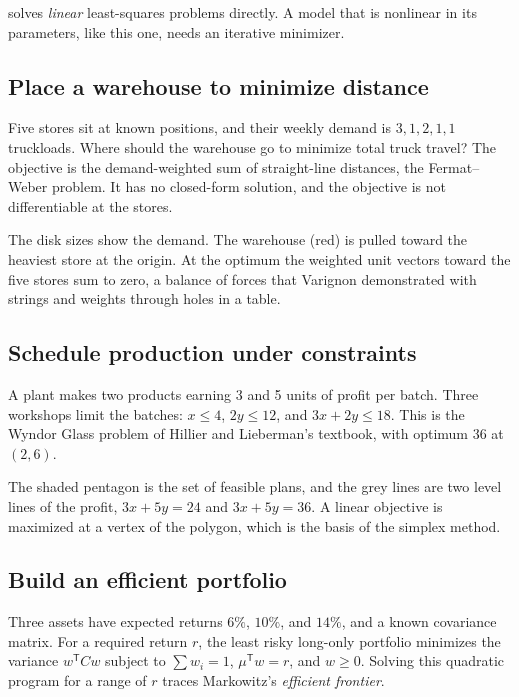 
 solves \emph{linear} least-squares problems directly. A model that is
nonlinear in its parameters, like this one, needs an iterative minimizer.

\subsection*{Place a warehouse to minimize distance}

Five stores sit at known positions, and their weekly demand is \(3, 1, 2, 1,
1\) truckloads. Where should the warehouse go to minimize total truck travel?
The objective is the demand-weighted sum of straight-line distances, the
Fermat--Weber problem. It has no closed-form solution, and the objective is not
differentiable at the stores.


The disk sizes show the demand. The warehouse (red) is pulled toward the
heaviest store at the origin. At the optimum the weighted unit vectors toward
the five stores sum to zero, a balance of forces that Varignon demonstrated
with strings and weights through holes in a table.

\subsection*{Schedule production under constraints}

A plant makes two products earning 3 and 5 units of profit per batch. Three
workshops limit the batches: \(x \le 4\), \(2y \le 12\), and \(3x + 2y \le
18\). This is the Wyndor Glass problem of Hillier and Lieberman's textbook,
with optimum \(36\) at \((2, 6)\).


The shaded pentagon is the set of feasible plans, and the grey lines are two
level lines of the profit, \(3x + 5y = 24\) and \(3x + 5y = 36\). A linear
objective is maximized at a vertex of the polygon, which is the basis of the
simplex method.

\subsection*{Build an efficient portfolio}

Three assets have expected returns \(6\%\), \(10\%\), and \(14\%\), and a known
covariance matrix. For a required return \(r\), the least risky long-only
portfolio minimizes the variance \(w^{\mathsf T} C w\) subject to
\(\sum w_i = 1\), \(\mu^{\mathsf T} w = r\), and \(w \ge 0\). Solving this
quadratic program for a range of \(r\) traces Markowitz's \emph{efficient
frontier}.

